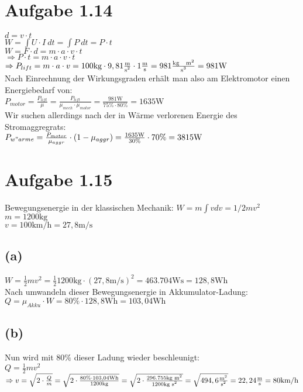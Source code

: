\documentclass[]{article}
\newcommand{\rarr}{\Rightarrow}
\newcommand{\unit}[1]{\text{#1}}
\newcommand{\fracunit}[2]{\frac{\unit{#1}}{\unit{#2}}}
\newcommand{\textsq}[1]{\ensuremath{\text{#1}^2}}
\newcommand{\textpow}[2]{\ensuremath{\text{#1}^{#2}}}
\begin{document}
\section*{Aufgabe 1.14}
	$d = v \cdot t$\\
	$W = \int U\cdot I ~dt = \int P ~dt = P \cdot t$\\
	$W = F \cdot d = m \cdot a \cdot v \cdot t$\\
	$\rarr P \cdot t = m \cdot a \cdot v \cdot t$\\
	$\rarr P_{lift} = m \cdot a \cdot v = 100\unit{kg} \cdot 9,81\fracunit{m}{\textsq{s}} \cdot 1\fracunit{m}{s} = 981\fracunit{kg ~ \textsq{m}}{\textpow{s}{3}} = 981 \unit{W}$\\
	Nach Einrechnung der Wirkungsgraden erhält man also am Elektromotor einen Energiebedarf von:\\
	$P_{motor} = \frac{P_{lift}}{\mu} = \frac{P_{lift}}{\mu_{mech} \cdot \mu_{motor}} = \frac{981 \unit{W}}{75\% \cdot 80\%} = 1635\unit{W}$\\
	Wir suchen allerdings nach der in Wärme verlorenen Energie des Stromaggregrats:\\
	$P_{w"arme} = \frac{P_{motor}}{\mu_{aggr}} \cdot (1-\mu_{aggr}) = \frac{1635\unit{W}}{30\%} \cdot 70\% = 3815\unit{W}$

\section*{Aufgabe 1.15}
	Bewegungsenergie in der klassischen Mechanik: $W = m \int v dv = 1/2 m v^2$\\
	$m = 1200\unit{kg}$\\
	$v = 100\unit{km/h} = 27,8\unit{m/s}$
\subsection*{(a)}
	$W = \frac{1}{2} m v^2 = \frac{1}{2} 1200\unit{kg} \cdot (27,8\unit{m/s})^2 = 463.704\unit{Ws} = 128,8 \unit{Wh}$\\
	Nach umwandeln dieser Bewegungsenergie in Akkumulator-Ladung:\\
	$Q = \mu_{Akku} \cdot W = 80\% \cdot 128,8 \unit{Wh} = 103,04\unit{Wh}$
\subsection*{(b)}
	Nun wird mit $80\%$ dieser Ladung wieder beschleunigt:\\
	$Q = \frac{1}{2} m v^2$\\
	$\rarr v = \sqrt{ 2 \cdot \frac{Q}{m}} = \sqrt{2\cdot \frac{80\% \cdot 103,04\unit{Wh}}{1200\unit{kg}}} = \sqrt{2\cdot \frac{296.755\unit{kg~\textsq{m}}}{1200\unit{kg~\textsq{s}}}} = \sqrt{494,6 \fracunit{\textsq{m}}{\textsq{s}}} = 22,24 \fracunit{m}{s} = 80\unit{km/h}$
\end{document}
